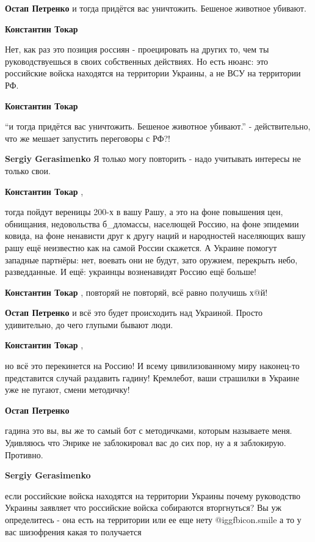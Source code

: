 \begin{itemize}
\begin{itemize}
\textbf{Остап Петренко} и тогда придётся вас уничтожить. Бешеное животное убивают.

\textbf{Константин Токар} 

Нет, как раз это позиция россиян - проецировать на других то, чем ты
руководствуешься в своих собственных действиях. Но есть нюанс: это российские
войска находятся на территории Украины, а не ВСУ на территории РФ.

\textbf{Константин Токар} 

\enquote{и тогда придётся вас уничтожить. Бешеное животное убивают.} -
действительно, что же мешает запустить переговоры с РФ?!

\textbf{Sergiy Gerasimenko} Я только могу повторить - надо учитывать интересы не только свои.

\textbf{Константин Токар} , 

тогда пойдут вереницы 200-х в вашу Рашу, а это на фоне повышения цен,
обнищания, недовольства б_дломассы, населющей Россию, на фоне эпидемии ковида,
на фоне ненависти друг к другу наций и народностей населяющих вашу рашу ещё
неизвестно как на самой России скажется. А Украине помогут западные партнёры:
нет, воевать они не будут, зато оружием, перекрыть небо, разведданные. И ещё:
украинцы возненавидят Россию ещё больше!

\textbf{Константин Токар} , повторяй не повторяй, всё равно получишь х@й!

\textbf{Остап Петренко} и всё это будет происходить над Украиной. Просто удивительно, до чего глупыми бывают люди.

\textbf{Константин Токар} , 

но всё это перекинется на Россию! И всему цивилизованному миру наконец-то
представится случай раздавить гадину! Кремлебот, ваши страшилки в Украине уже
не пугают, смени методичку!

\textbf{Остап Петренко} 

гадина это вы, вы же то самый бот с методичками, которым называете меня.
Удивляюсь что Энрике не заблокировал вас до сих пор, ну а я заблокирую.
Противно.

\textbf{Sergiy Gerasimenko} 

если российские войска находятся на территории Украины почему руководство
Украины заявляет что российские войска собираются вторгнуться? Вы уж
определитесь - она есть на территории или ее еще нету  @igg{fbicon.smile}  а то у вас шизофрения
какая то получается


\end{itemize}
\end{itemize}
